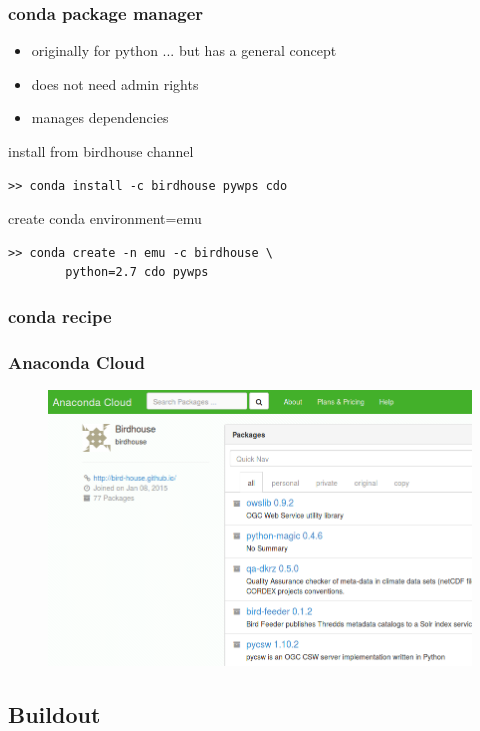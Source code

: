 \documentclass{beamer}
\begin{document}
  \begin{frame}[fragile]
    \frametitle{conda package manager}
    \begin{itemize}
      \item originally for python ... but has a general concept
      \item does not need admin rights
      \item manages dependencies
    \end{itemize}
    \begin{block}{install from birdhouse channel}
      \begin{lstlisting}
>> conda install -c birdhouse pywps cdo 
      \end{lstlisting}
    \end{block}
    \begin{block}{create conda environment=emu}
      \begin{lstlisting}
>> conda create -n emu -c birdhouse \
        python=2.7 cdo pywps 
      \end{lstlisting}
    \end{block}
\end{frame}

  \begin{frame}
    \frametitle{conda recipe}
    
\end{frame}

  \begin{frame}[plain]
    \frametitle{Anaconda Cloud}
    \begin{figure}
      \includegraphics[width=11.5cm]{images/anaconda-cloud.png}
    \end{figure}
  \end{frame}

  \subsection{Buildout}
\end{document}
